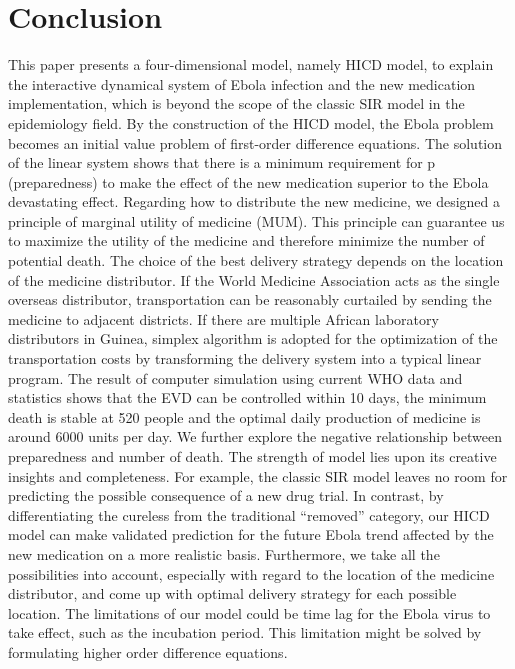 \documentclass[12pt,a4paper,titlepage]{article}
\begin{document}
\section{Conclusion}
\label{section_conclude}
This paper presents a four-dimensional model, namely HICD model, to explain the interactive dynamical system of Ebola infection and the new medication implementation, which is beyond the scope of the classic SIR model in the epidemiology field. By the construction of the HICD model, the Ebola problem becomes an initial value problem of first-order difference equations. The solution of the linear system shows that there is a minimum requirement for p (preparedness) to make the effect of the new medication superior to the Ebola devastating effect. 
Regarding how to distribute the new medicine, we designed a principle of marginal utility of medicine (MUM). This principle can guarantee us to maximize the utility of the medicine and therefore minimize the number of potential death.
The choice of the best delivery strategy depends on the location of the medicine distributor. If the World Medicine Association acts as the single overseas distributor, transportation can be reasonably curtailed by sending the medicine to adjacent districts. If there are multiple African laboratory distributors in Guinea, simplex algorithm is adopted for the optimization of the transportation costs by transforming the delivery system into a typical linear program.
The result of computer simulation using current WHO data and statistics shows that the EVD can be controlled within 10 days, the minimum death is stable at 520 people and the optimal daily production of medicine is around 6000 units per day. We further explore the negative relationship between preparedness and number of death.
The strength of model lies upon its creative insights and completeness. For example, the classic SIR model leaves no room for predicting the possible consequence of a new drug trial. In contrast, by differentiating the cureless from the traditional “removed” category, our HICD model can make validated prediction for the future Ebola trend affected by the new medication on a more realistic basis. Furthermore, we take all the possibilities into account, especially with regard to the location of the medicine distributor, and come up with optimal delivery strategy for each possible location.
The limitations of our model could be time lag for the Ebola virus to take effect, such as the incubation period. This limitation might be solved by formulating higher order difference equations.
\end{document}
